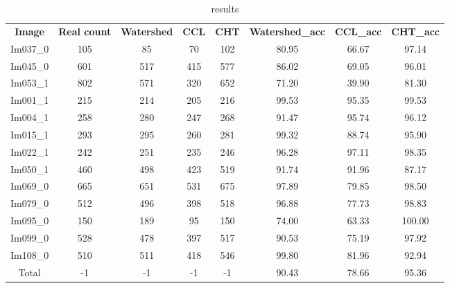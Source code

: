 \begin{table}[H]
\centering
\begin{tabular}{|  c | c | c | c | c | c | c | c |}
\hline
\textbf{Image} & \textbf{Real count} & \textbf{Watershed} & \textbf{CCL} & \textbf{CHT} & \textbf{Watershed\_acc} & \textbf{CCL\_acc} & \textbf{CHT\_acc} \\
Im037\_0 & 105 & 85 & 70 & 102 & 80.95 & 66.67 & 97.14 \\
Im045\_0 & 601 & 517 & 415 & 577 & 86.02 & 69.05 & 96.01 \\
Im053\_1 & 802 & 571 & 320 & 652 & 71.20 & 39.90 & 81.30 \\
Im001\_1 & 215 & 214 & 205 & 216 & 99.53 & 95.35 & 99.53 \\
Im004\_1 & 258 & 280 & 247 & 268 & 91.47 & 95.74 & 96.12 \\
Im015\_1 & 293 & 295 & 260 & 281 & 99.32 & 88.74 & 95.90 \\
Im022\_1 & 242 & 251 & 235 & 246 & 96.28 & 97.11 & 98.35 \\
Im050\_1 & 460 & 498 & 423 & 519 & 91.74 & 91.96 & 87.17 \\
Im069\_0 & 665 & 651 & 531 & 675 & 97.89 & 79.85 & 98.50 \\
Im079\_0 & 512 & 496 & 398 & 518 & 96.88 & 77.73 & 98.83 \\
Im095\_0 & 150 & 189 & 95 & 150 & 74.00 & 63.33 & 100.00 \\
Im099\_0 & 528 & 478 & 397 & 517 & 90.53 & 75.19 & 97.92 \\
Im108\_0 & 510 & 511 & 418 & 546 & 99.80 & 81.96 & 92.94 \\
Total & -1 & -1 & -1 & -1 & 90.43 & 78.66 & 95.36 \\
\hline
\end{tabular}
\caption{results}
\label{table:result}
\end{table}